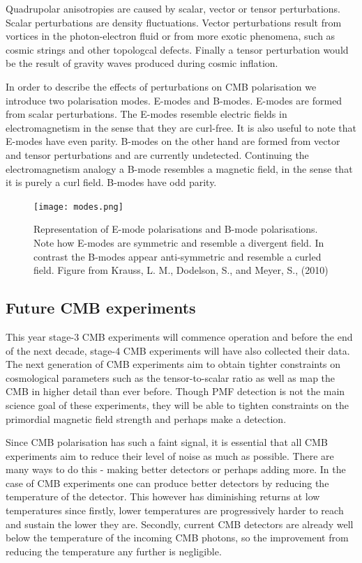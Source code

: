 Quadrupolar anisotropies are caused by scalar, vector or tensor perturbations. Scalar perturbations are density fluctuations. Vector perturbations result from vortices in the photon-electron fluid or from more exotic phenomena, such as cosmic strings and other topologcal defects. Finally a tensor perturbation would be the result of gravity waves produced during cosmic inflation.  

In order to describe the effects of perturbations on CMB polarisation we introduce two polarisation modes. E-modes and B-modes. E-modes are formed from scalar perturbations. The E-modes resemble electric fields in electromagnetism in the sense that they are curl-free. It is also useful to note that E-modes have even parity. B-modes on the other hand are formed from vector and tensor perturbations and are currently undetected. Continuing the electromagnetism analogy a B-mode resembles a magnetic field, in the sense that it is purely a curl field. B-modes have odd parity.

\begin{figure}[h]
\centering
\texttt{[image: modes.png]}
\caption{Representation of E-mode polarisations and B-mode polarisations. Note how E-modes are symmetric and resemble a divergent field. In contrast the B-modes appear anti-symmetric and resemble a curled field. Figure from Krauss, L. M., Dodelson, S., and Meyer, S., (2010) \cite{39087c288ce54d4bb9580169e1666880}}
\label{fig:modes}
\end{figure}

\subsection{Future CMB experiments}
This year stage-3 CMB experiments will commence operation and before the end of the next decade, stage-4 CMB experiments will have also collected their data. The next generation of CMB experiments aim to obtain tighter constraints on cosmological parameters such as the tensor-to-scalar ratio as well as map the CMB in higher detail than ever before. Though PMF detection is not the main science goal of these experiments, they will be able to tighten constraints on the primordial magnetic field strength and perhaps make a detection.

Since CMB polarisation has such a faint signal, it is essential that all CMB experiments aim to reduce their level of noise as much as possible. There are many ways to do this - making better detectors or perhaps adding more. In the case of CMB experiments one can produce better detectors by reducing the temperature of the detector. This however has diminishing returns at low temperatures since firstly, lower temperatures are progressively harder to reach and sustain the lower they are. Secondly, current CMB detectors are already well below the temperature of the incoming CMB photons, so the improvement from reducing the temperature any further is negligible.

